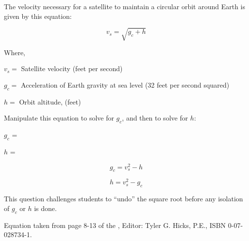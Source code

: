 

The velocity necessary for a satellite to maintain a circular orbit around Earth is given by this equation:

$$v_s = \sqrt {g_c + h}$$

\noindent
Where,

$v_s =$ Satellite velocity (feet per second)

$g_c =$ Acceleration of Earth gravity at sea level (32 feet per second squared)

$h =$ Orbit altitude, (feet)

\vskip 10pt

Manipulate this equation to solve for $g_c$, and then to solve for $h$:

\vskip 10pt

$g_c$ = 

\vskip 30pt

$h$ = 






$$g_c = v_s^2 - h$$

\vskip 20pt

$$h = v_s^2 - g_c$$







This question challenges students to ``undo'' the square root before any isolation of $g_c$ or $h$ is done.

\vskip 10pt

Equation taken from page 8-13 of the , Editor: Tyler G. Hicks, P.E., ISBN 0-07-028734-1.




